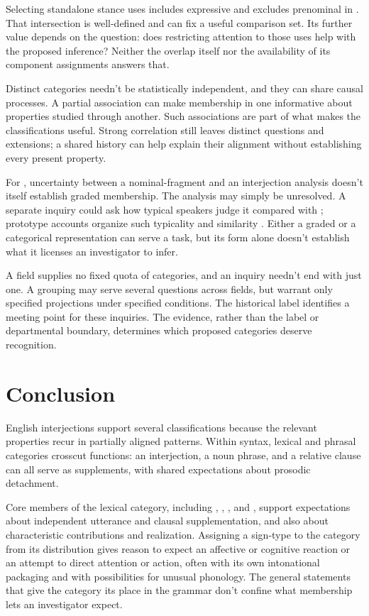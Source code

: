 \documentclass[12pt]{article}
\begin{document}
Selecting standalone stance uses includes expressive 
and excludes prenominal  in . That
intersection is well-defined and can fix a useful comparison set.
Its further value depends on the question: does restricting attention
to those uses help with the proposed inference? Neither the overlap
itself nor the availability of its component assignments answers that.

Distinct categories needn't be statistically independent, and they can
share causal processes. A partial association can make membership in
one informative about properties studied through another. Such associations
are part of what makes the classifications useful. Strong correlation
still leaves distinct questions and extensions; a shared history can
help explain their alignment without establishing every present property.

For , uncertainty between a nominal-fragment and an
interjection analysis doesn't itself establish graded membership. The
analysis may simply be unresolved. A separate inquiry could ask how
typical speakers judge it compared with ; prototype
accounts organize such typicality and similarity \citep{rosch1975,taylor2003}.
Either a graded or a categorical representation can serve a task,
but its form alone doesn't establish what it licenses an investigator
to infer.

A field supplies no fixed quota of categories, and an inquiry
needn't end with just one. A grouping may serve several questions across
fields, but warrant only specified projections under specified conditions.
The historical label  identifies a meeting point for
these inquiries. The evidence, rather than the label or departmental
boundary, determines which proposed categories deserve recognition.

\section{Conclusion}\label{sec:conclusion}

English interjections support several classifications because the relevant
properties recur in partially aligned patterns. Within syntax, lexical
and phrasal categories crosscut functions: an interjection, a noun phrase,
and a relative clause can all serve as supplements, with shared
expectations about prosodic detachment.

Core members of the lexical category, including ,
, , and , support expectations
about independent utterance and clausal supplementation, and also about
characteristic contributions and realization. Assigning a sign-type to the
category from its distribution gives reason to expect an affective or
cognitive reaction or an attempt to direct attention or action, often with
its own intonational packaging and with possibilities for unusual phonology.
The general statements that give the category its place in the grammar
don't confine what membership lets an investigator expect.
\end{document}
